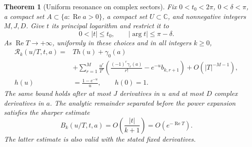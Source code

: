 \documentclass[11pt,a4paper]{article}
\numberwithin{equation}{section}
\newtheorem{theorem}{Theorem}[section]
\theoremstyle{definition}
\theoremstyle{remark}
\begin{document}
\begin{theorem}[Uniform resonance on complex sectors]\label{thm:sector}
Fix $0<t_0<2\pi$, $0<\delta<\pi$, a compact set
$A\subset\{a:\operatorname{Re}a>0\}$, a compact set $U\subset\mathbb C$,
and nonnegative integers $M,J,D$. Give $t$ its principal logarithm and
restrict it to
\[
 0<|t|\le t_0,\qquad |\arg t|\le\pi-\delta.
\]
As $\operatorname{Re}T\to+\infty$, uniformly in these choices and in all
integers $k\ge0$,
\begin{align*}
 \mathcal R_k(u/T,t,a)
 ={}&T h(u)+\gamma_0(a)\\
 &+\sum_{r=1}^{M}\frac{u^r}{T^r}
       \left(\frac{(-1)^r\gamma_r(a)}{r!}
                    -e^{-u}b_{k,r+1}\right)
       +O(|T|^{-M-1}),\\
 h(u)&=\frac{1-e^{-u}}u,\qquad h(0)=1.
\end{align*}
The same bound holds after at most $J$ derivatives in $u$ and at most
$D$ complex derivatives in $a$. The analytic remainder separated before
the power expansion satisfies the sharper estimate
\[
 B_k(u/T,t,a)=O\left(\frac{|t|}{k+1}\right)
             =O(e^{-\operatorname{Re}T}).
\]
The latter estimate is also valid with the stated fixed derivatives.
\end{theorem}
\end{document}
